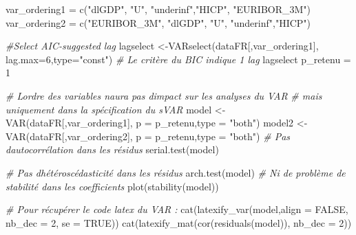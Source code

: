 \documentclass[
  11pt,
]{article}
\newenvironment{Shaded}{\begin{snugshade}}{\end{snugshade}}
\newcommand{\AttributeTok}[1]{\textcolor[rgb]{0.77,0.63,0.00}{#1}}
\newcommand{\CommentTok}[1]{\textcolor[rgb]{0.56,0.35,0.01}{\textit{#1}}}
\newcommand{\ConstantTok}[1]{\textcolor[rgb]{0.00,0.00,0.00}{#1}}
\newcommand{\DecValTok}[1]{\textcolor[rgb]{0.00,0.00,0.81}{#1}}
\newcommand{\FunctionTok}[1]{\textcolor[rgb]{0.00,0.00,0.00}{#1}}
\newcommand{\NormalTok}[1]{#1}
\newcommand{\OtherTok}[1]{\textcolor[rgb]{0.56,0.35,0.01}{#1}}
\newcommand{\StringTok}[1]{\textcolor[rgb]{0.31,0.60,0.02}{#1}}
\begin{document}
\begin{Shaded}
\begin{Highlighting}[]
\NormalTok{var\_ordering1 }\OtherTok{=} \FunctionTok{c}\NormalTok{(}\StringTok{"dlGDP"}\NormalTok{,}
                 \StringTok{"U"}\NormalTok{, }\StringTok{"underinf"}\NormalTok{,}\StringTok{"HICP"}\NormalTok{, }\StringTok{"EURIBOR\_3M"}\NormalTok{)}
\NormalTok{var\_ordering2 }\OtherTok{=} \FunctionTok{c}\NormalTok{(}\StringTok{"EURIBOR\_3M"}\NormalTok{, }\StringTok{"dlGDP"}\NormalTok{,}
                 \StringTok{"U"}\NormalTok{, }\StringTok{"underinf"}\NormalTok{,}\StringTok{"HICP"}\NormalTok{)}

\CommentTok{\#Select AIC{-}suggested lag}
\NormalTok{lagselect }\OtherTok{\textless{}{-}}\FunctionTok{VARselect}\NormalTok{(dataFR[,var\_ordering1],}
                      \AttributeTok{lag.max=}\DecValTok{6}\NormalTok{,}\AttributeTok{type=}\StringTok{"const"}\NormalTok{)}
\CommentTok{\# Le critère du BIC indique 1 lag}
\NormalTok{lagselect}
\NormalTok{p\_retenu }\OtherTok{=} \DecValTok{1}

\CommentTok{\# L\textquotesingle{}ordre des variables n\textquotesingle{}aura pas d\textquotesingle{}impact sur les analyses du VAR}
\CommentTok{\# mais uniquement dans la spécification du sVAR}
\NormalTok{model }\OtherTok{\textless{}{-}} \FunctionTok{VAR}\NormalTok{(dataFR[,var\_ordering1],}
           \AttributeTok{p =}\NormalTok{ p\_retenu,}\AttributeTok{type =} \StringTok{"both"}\NormalTok{)}
\NormalTok{model2 }\OtherTok{\textless{}{-}} \FunctionTok{VAR}\NormalTok{(dataFR[,var\_ordering2],}
             \AttributeTok{p =}\NormalTok{ p\_retenu,}\AttributeTok{type =} \StringTok{"both"}\NormalTok{)}
\CommentTok{\# Pas d\textquotesingle{}autocorrélation dans les résidus}
\FunctionTok{serial.test}\NormalTok{(model)}

\CommentTok{\# Pas d\textquotesingle{}hétéroscédasticité dans les résidus}
\FunctionTok{arch.test}\NormalTok{(model)}
\CommentTok{\# Ni de problème de stabilité dans les coefficients}
\FunctionTok{plot}\NormalTok{(}\FunctionTok{stability}\NormalTok{(model))}

\CommentTok{\# Pour récupérer le code latex du VAR :}
\FunctionTok{cat}\NormalTok{(}\FunctionTok{latexify\_var}\NormalTok{(model,}\AttributeTok{align =} \ConstantTok{FALSE}\NormalTok{, }\AttributeTok{nb\_dec =} \DecValTok{2}\NormalTok{, }\AttributeTok{se =} \ConstantTok{TRUE}\NormalTok{))}
\FunctionTok{cat}\NormalTok{(}\FunctionTok{latexify\_mat}\NormalTok{(}\FunctionTok{cor}\NormalTok{(}\FunctionTok{residuals}\NormalTok{(model)), }\AttributeTok{nb\_dec =} \DecValTok{2}\NormalTok{))}



\end{Highlighting}
\end{Shaded}
\end{document}
